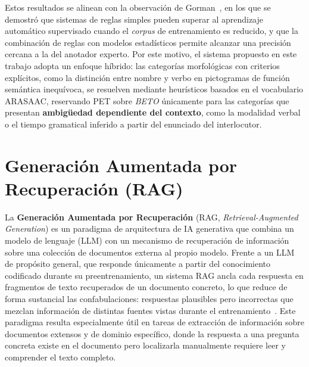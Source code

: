 Estos resultados se alinean con la observación de Gorman~\cite{lsa_morphological_auto},
en los que se demostró que sistemas de reglas simples pueden superar al aprendizaje
automático supervisado cuando el \emph{corpus} de entrenamiento es reducido, y que la
combinación de reglas con modelos estadísticos permite alcanzar una precisión cercana
a la del anotador experto. Por este motivo, el sistema propuesto en este trabajo adopta
un enfoque híbrido: las categorías morfológicas con criterios explícitos, como la
distinción entre nombre y verbo en pictogramas de función semántica inequívoca, se
resuelven mediante heurísticos basados en el vocabulario \ac{ARASAAC}, reservando
\ac{PET} sobre \emph{BETO} únicamente para las categorías que presentan \textbf{ambigüedad
dependiente del contexto}, como la modalidad verbal o el tiempo gramatical inferido a
partir del enunciado del interlocutor.


\newpage
\section{Generación Aumentada por Recuperación (RAG)}
\label{sec:ia_protocolos}

La \textbf{Generación Aumentada por Recuperación} (\ac{RAG}, \emph{Retrieval-Augmented Generation}) es
un paradigma de arquitectura de \ac{IA} generativa que combina un modelo de lenguaje (\ac{LLM}) con
un mecanismo de recuperación de información sobre una colección de documentos externa al
propio modelo. Frente a un \ac{LLM} de propósito general, que responde únicamente a partir
del conocimiento codificado durante su preentrenamiento, un sistema \ac{RAG} ancla cada
respuesta en fragmentos de texto recuperados de un documento concreto, lo que reduce de
forma sustancial las confabulaciones: respuestas plausibles pero incorrectas que mezclan
información de distintas fuentes vistas durante el entrenamiento~\cite{rag_lewis2020}.
Este paradigma resulta especialmente útil en tareas de extracción de información sobre
documentos extensos y de dominio específico, donde la respuesta a una pregunta concreta
existe en el documento pero localizarla manualmente requiere leer y comprender el texto
completo.

